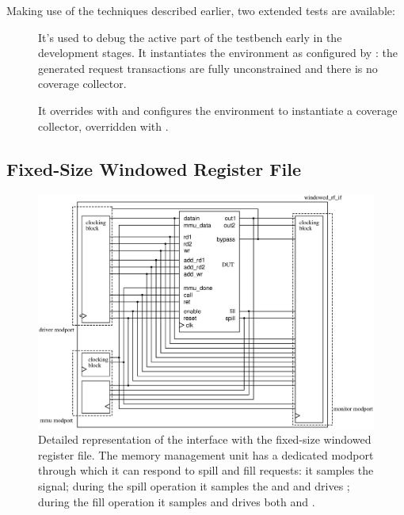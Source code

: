Making use of the techniques described earlier, two extended tests are available:
\begin{description}
    \item[] It's used to debug the active part of the testbench early in the development stages. It instantiates the environment as configured by : the generated request transactions are fully unconstrained and there is no coverage collector.
    \item[] It overrides  with  and configures the environment to instantiate a coverage collector, overridden with .
\end{description}

\subsection{Fixed-Size Windowed Register File}\label{subsec:wrf}

\begin{figure}
    \centering
    \includegraphics[width=.7\linewidth]{fig/windowed_rf/windowed_rf_if_schematic.eps}
    \caption{Detailed representation of the interface with the fixed-size windowed register file. The memory management unit has a dedicated modport through which it can respond to spill and fill requests: it samples the  signal; during the spill operation it samples the  and  and drives ; during the fill operation it samples  and drives both  and .}
    \label{fig:wrf_if}
\end{figure}


